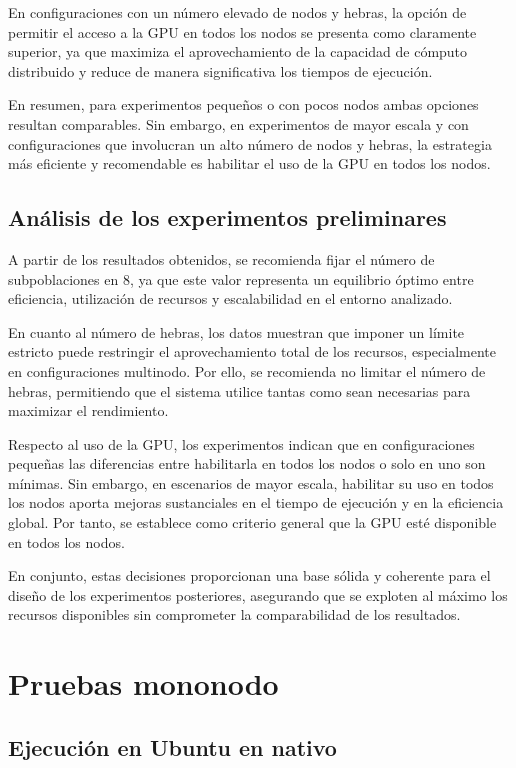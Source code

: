 En configuraciones con un número elevado de nodos y hebras, la opción de permitir el acceso a la GPU en todos los nodos se presenta como claramente superior, ya que maximiza el aprovechamiento de la capacidad de cómputo distribuido y reduce de manera significativa los tiempos de ejecución.

En resumen, para experimentos pequeños o con pocos nodos ambas opciones resultan comparables. Sin embargo, en experimentos de mayor escala y con configuraciones que involucran un alto número de nodos y hebras, la estrategia más eficiente y recomendable es habilitar el uso de la GPU en todos los nodos.

\subsection{Análisis de los experimentos preliminares}

A partir de los resultados obtenidos, se recomienda fijar el número de subpoblaciones en 8, ya que este valor representa un equilibrio óptimo entre eficiencia, utilización de recursos y escalabilidad en el entorno analizado.

En cuanto al número de hebras, los datos muestran que imponer un límite estricto puede restringir el aprovechamiento total de los recursos, especialmente en configuraciones multinodo. Por ello, se recomienda no limitar el número de hebras, permitiendo que el sistema utilice tantas como sean necesarias para maximizar el rendimiento.

Respecto al uso de la GPU, los experimentos indican que en configuraciones pequeñas las diferencias entre habilitarla en todos los nodos o solo en uno son mínimas. Sin embargo, en escenarios de mayor escala, habilitar su uso en todos los nodos aporta mejoras sustanciales en el tiempo de ejecución y en la eficiencia global. Por tanto, se establece como criterio general que la GPU esté disponible en todos los nodos.

En conjunto, estas decisiones proporcionan una base sólida y coherente para el diseño de los experimentos posteriores, asegurando que se exploten al máximo los recursos disponibles sin comprometer la comparabilidad de los resultados.

\section{Pruebas mononodo}

\subsection{Ejecución en Ubuntu en nativo}

